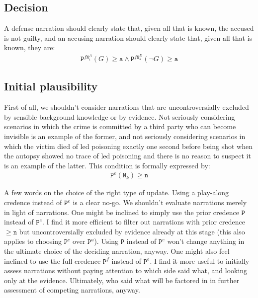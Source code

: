\documentclass[10pt,leqno]{article}
\newcommand{\n}{\neg}
\newcommand{\et}{\wedge}
\begin{document}
\subsection{Decision}

A defense narration should clearly state that, given all that is known, the accused is not guilty, and an accusing narration should clearly state that, given all that is known, they are:
\begin{align}
\tag{Decision} \label{Decision} \mathtt{P}^{f\mathtt{N}^A_i}(G)\geq \mathtt{a} \et \mathtt{P}^{f\mathtt{N}^D_k}(\n G)\geq \mathtt{a}  
\end{align}


\subsection{Initial plausibility}



First of all, we shouldn't consider narrations that are uncontroversially excluded by sensible background knowledge or by evidence. Not seriously considering scenarios in which the crime is committed by a third party who can become invisible  is an example of the former, and not seriously considering scenarios in which the victim died of led poisoning exactly one second before being shot when the autopsy showed no trace of led poisoning and there is no reason to suspect it is an example of the latter. This condition is formally expressed by:
\begin{align}
\tag{Initial plausibility} \label{Initial plausibility} \mathtt{P}^e(\mathtt{N}_k)\geq \mathtt{n} 
\end{align}


A few words on the choice of the right type of update. Using a play-along credence instead of $\mathtt{P}^e$ is a clear no-go. We shouldn't evaluate narrations merely in light of narrations. One might be inclined to simply use the prior credence $\mathtt{P}$ instead of $\mathtt{P}^e$. I find it more efficient to filter out narrations with prior credence $\geq \mathtt{n}$ but uncontroversially excluded by evidence already at this stage (this also applies to choosing $\mathtt{P}^e$ over $\mathtt{P}^a$). Using $\mathtt{P}$ instead of $\mathtt{P}^e$ won't change anything in the ultimate choice of the deciding narration, anyway. One might also feel inclined to use the full  credence $\mathtt{P}^f$ instead of $\mathtt{P}^e$. I find it more useful to initially assess narrations without paying attention to which side said what, and looking only at the evidence. Ultimately, who said what will be factored  in in  further assessment of competing narrations, anyway.
\end{document}
